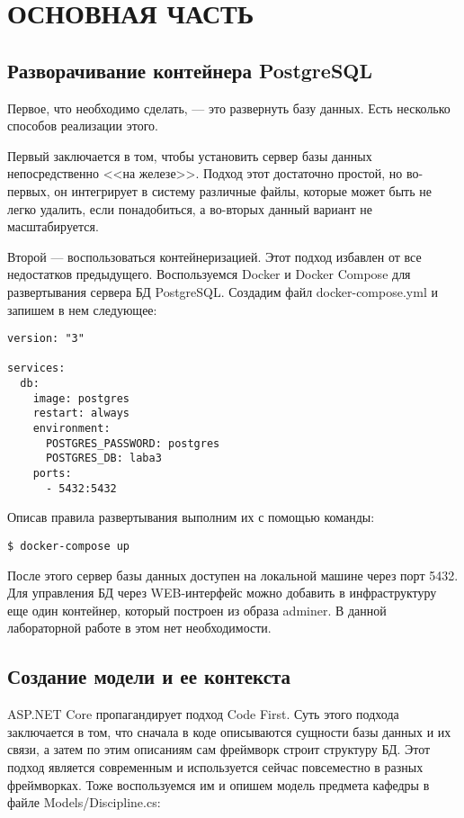 \chapter{ОСНОВНАЯ ЧАСТЬ}

\section{Разворачивание контейнера PostgreSQL}
Первое, что необходимо сделать, --- это развернуть базу данных. Есть несколько способов реализации этого.

Первый заключается в том, чтобы установить сервер базы данных непосредственно <<на железе>>. Подход этот достаточно простой, но во-первых, он интегрирует в систему различные файлы, которые может быть не легко удалить, если понадобиться, а во-вторых данный вариант не масштабируется.

Второй --- воспользоваться контейнеризацией. Этот подход избавлен от все недостатков предыдущего. Воспользуемся Docker и Docker Compose для развертывания сервера БД PostgreSQL. Создадим файл docker-compose.yml и запишем в нем следующее:

\begin{verbatim}
version: "3"

services:
  db:
    image: postgres
    restart: always
    environment:
      POSTGRES_PASSWORD: postgres
      POSTGRES_DB: laba3
    ports:
      - 5432:5432
\end{verbatim}

Описав правила развертывания выполним их с помощью команды:

\begin{verbatim}
$ docker-compose up
\end{verbatim}

После этого сервер базы данных доступен на локальной машине через порт 5432. Для управления БД через WEB-интерфейс можно добавить в инфраструктуру еще один контейнер, который построен из образа adminer. В данной лабораторной работе в этом нет необходимости.

\section{Создание модели и ее контекста}
ASP.NET Core пропагандирует подход Code First. Суть этого подхода заключается в том, что сначала в коде описываются сущности базы данных и их связи, а затем по этим описаниям сам фреймворк строит структуру БД. Этот подход является современным и используется сейчас повсеместно в разных фреймворках. Тоже воспользуемся им и опишем модель предмета кафедры в файле Models/Discipline.cs:

